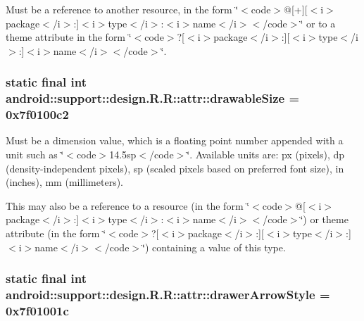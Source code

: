 Must be a reference to another resource, in the form \char`\"{}$<$code$>$@\mbox{[}+\mbox{]}\mbox{[}$<$i$>$package$<$/i$>$:\mbox{]}$<$i$>$type$<$/i$>$:$<$i$>$name$<$/i$>$$<$/code$>$\char`\"{} or to a theme attribute in the form \char`\"{}$<$code$>$?\mbox{[}$<$i$>$package$<$/i$>$:\mbox{]}\mbox{[}$<$i$>$type$<$/i$>$:\mbox{]}$<$i$>$name$<$/i$>$$<$/code$>$\char`\"{}. \hypertarget{classandroid_1_1support_1_1design_1_1_r_1_1attr_3f342e2aac21b186ff0f94aa70e8b2a5}{
\subsubsection[{drawableSize}]{\setlength{\rightskip}{0pt plus 5cm}static final int android::support::design.R.R::attr::drawableSize = 0x7f0100c2}}
\label{classandroid_1_1support_1_1design_1_1_r_1_1attr_3f342e2aac21b186ff0f94aa70e8b2a5}


Must be a dimension value, which is a floating point number appended with a unit such as \char`\"{}$<$code$>$14.5sp$<$/code$>$\char`\"{}. Available units are: px (pixels), dp (density-independent pixels), sp (scaled pixels based on preferred font size), in (inches), mm (millimeters). 

This may also be a reference to a resource (in the form \char`\"{}$<$code$>$@\mbox{[}$<$i$>$package$<$/i$>$:\mbox{]}$<$i$>$type$<$/i$>$:$<$i$>$name$<$/i$>$$<$/code$>$\char`\"{}) or theme attribute (in the form \char`\"{}$<$code$>$?\mbox{[}$<$i$>$package$<$/i$>$:\mbox{]}\mbox{[}$<$i$>$type$<$/i$>$:\mbox{]}$<$i$>$name$<$/i$>$$<$/code$>$\char`\"{}) containing a value of this type. \hypertarget{classandroid_1_1support_1_1design_1_1_r_1_1attr_2d26bd2ed716f348098a04781dad639a}{
\subsubsection[{drawerArrowStyle}]{\setlength{\rightskip}{0pt plus 5cm}static final int android::support::design.R.R::attr::drawerArrowStyle = 0x7f01001c}}
\label{classandroid_1_1support_1_1design_1_1_r_1_1attr_2d26bd2ed716f348098a04781dad639a}


